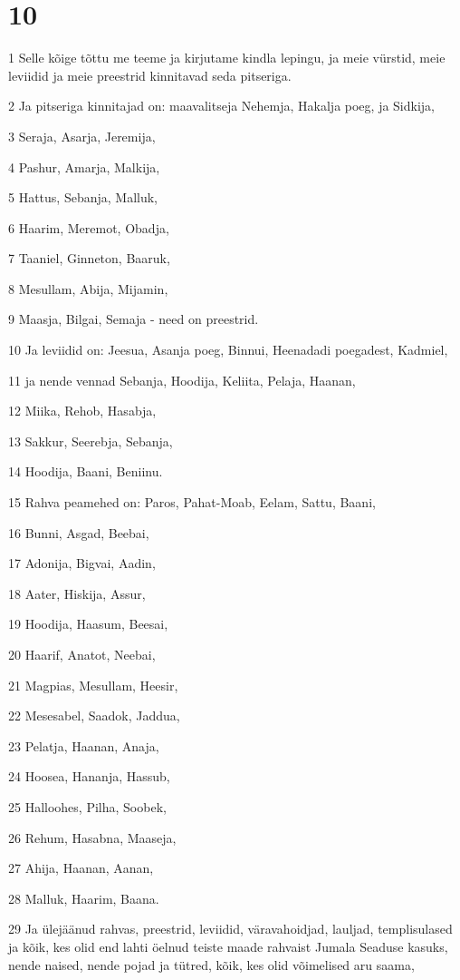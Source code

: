 \chapter{10}

\par 1 Selle kõige tõttu me teeme ja kirjutame kindla lepingu, ja meie vürstid, meie leviidid ja meie preestrid kinnitavad seda pitseriga.
\par 2 Ja pitseriga kinnitajad on: maavalitseja Nehemja, Hakalja poeg, ja Sidkija,
\par 3 Seraja, Asarja, Jeremija,
\par 4 Pashur, Amarja, Malkija,
\par 5 Hattus, Sebanja, Malluk,
\par 6 Haarim, Meremot, Obadja,
\par 7 Taaniel, Ginneton, Baaruk,
\par 8 Mesullam, Abija, Mijamin,
\par 9 Maasja, Bilgai, Semaja - need on preestrid.
\par 10 Ja leviidid on: Jeesua, Asanja poeg, Binnui, Heenadadi poegadest, Kadmiel,
\par 11 ja nende vennad Sebanja, Hoodija, Keliita, Pelaja, Haanan,
\par 12 Miika, Rehob, Hasabja,
\par 13 Sakkur, Seerebja, Sebanja,
\par 14 Hoodija, Baani, Beniinu.
\par 15 Rahva peamehed on: Paros, Pahat-Moab, Eelam, Sattu, Baani,
\par 16 Bunni, Asgad, Beebai,
\par 17 Adonija, Bigvai, Aadin,
\par 18 Aater, Hiskija, Assur,
\par 19 Hoodija, Haasum, Beesai,
\par 20 Haarif, Anatot, Neebai,
\par 21 Magpias, Mesullam, Heesir,
\par 22 Mesesabel, Saadok, Jaddua,
\par 23 Pelatja, Haanan, Anaja,
\par 24 Hoosea, Hananja, Hassub,
\par 25 Halloohes, Pilha, Soobek,
\par 26 Rehum, Hasabna, Maaseja,
\par 27 Ahija, Haanan, Aanan,
\par 28 Malluk, Haarim, Baana.
\par 29 Ja ülejäänud rahvas, preestrid, leviidid, väravahoidjad, lauljad, templisulased ja kõik, kes olid end lahti öelnud teiste maade rahvaist Jumala Seaduse kasuks, nende naised, nende pojad ja tütred, kõik, kes olid võimelised aru saama,
